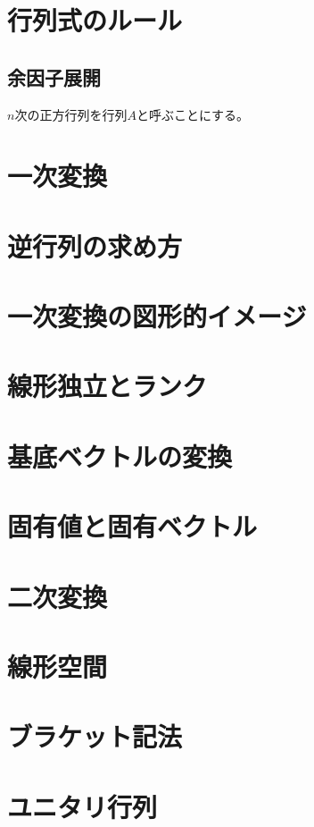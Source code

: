 \documentclass[]{ltjsarticle}%
\begin{document}
\section{行列式のルール}
\label{"sec:linear03"}

\subsection{余因子展開}
\(n\)次の正方行列を行列\(A\)と呼ぶことにする。

\section{一次変換}

\section{逆行列の求め方}

\section{一次変換の図形的イメージ}

\section{線形独立とランク}

\section{基底ベクトルの変換}

\section{固有値と固有ベクトル}

\section{二次変換}

\section{線形空間}

\section{ブラケット記法}

\section{ユニタリ行列}
\end{document}
